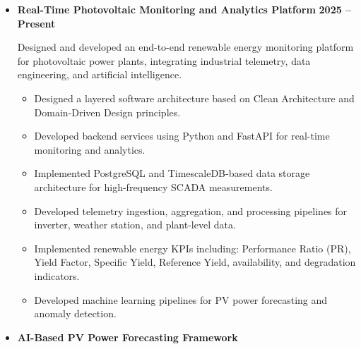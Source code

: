 \documentclass[letter,20pt]{article}
\begin{document}
\vspace{5pt}


\begin{itemize}
[
noitemsep,
topsep=5pt,
leftmargin=2ex
]


\item[]
\textbf{
Real-Time Photovoltaic Monitoring and Analytics Platform
}
\hfill
\textbf{2025 -- Present}


\vspace{3pt}


Designed and developed an end-to-end renewable energy monitoring platform for photovoltaic power plants, integrating industrial telemetry, data engineering, and artificial intelligence.



\begin{itemize}
[
noitemsep,
leftmargin=4ex
]


\item
Designed a layered software architecture based on Clean Architecture and Domain-Driven Design principles.

\item
Developed backend services using Python and FastAPI for real-time monitoring and analytics.

\item
Implemented PostgreSQL and TimescaleDB-based data storage architecture for high-frequency SCADA measurements.

\item
Developed telemetry ingestion, aggregation, and processing pipelines for inverter, weather station, and plant-level data.

\item
Implemented renewable energy KPIs including:
Performance Ratio (PR), Yield Factor, Specific Yield, Reference Yield, availability, and degradation indicators.

\item
Developed machine learning pipelines for PV power forecasting and anomaly detection.

\end{itemize}



\vspace{10pt}



\item[]
\textbf{
AI-Based PV Power Forecasting Framework
}



\vspace{3pt}



\end{itemize}
\end{document}
